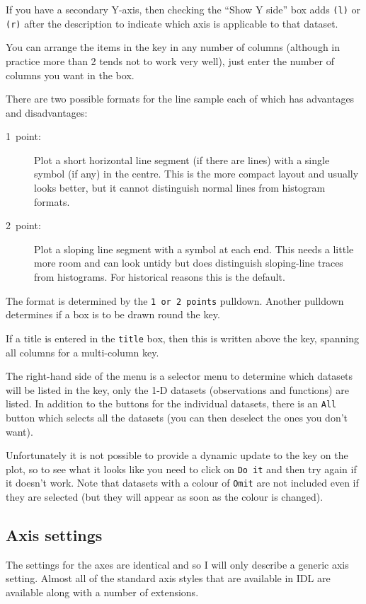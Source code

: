 \documentclass[11pt,twoside,english]{article}
\begin{document}
If you have a secondary Y-axis, then checking the ``Show Y side'' box
adds \texttt{(l)} or \texttt{(r)} after the description to indicate
which axis is applicable to that dataset.

You can arrange the items in the key in any number of columns (although
in practice more than 2 tends not to work very well), just enter the
number of columns you want in the box.

There are two possible formats for the line sample each of which has
advantages and disadvantages:

\begin{description}
\item [1~point:]Plot a short horizontal line segment (if there are
  lines) with a single symbol (if any) in the centre. This is the more
  compact layout and usually looks better, but it cannot distinguish
  normal lines from histogram formats.
\item [2~point:]Plot a sloping line segment with a symbol at each end.
  This needs a little more room and can look untidy but does
  distinguish sloping-line traces from histograms. For historical
  reasons this is the default.
\end{description}
The format is determined by the \texttt{1 or 2 points}
pulldown. Another pulldown determines if a box is to be drawn round the
key.

If a title is entered in the \texttt{title} box, then this is written
above the key, spanning all columns for a multi-column key.

The right-hand side of the menu is a selector menu to determine which
datasets will be listed in the key, only the 1-D datasets (observations
and functions) are listed. In addition to the buttons for the
individual datasets, there is an \texttt{All} button which selects all
the datasets (you can then deselect the ones you don't want).

Unfortunately it is not possible to provide a dynamic update to the key
on the plot, so to see what it looks like you need to click on
\texttt{Do it} and then try again if it doesn't work. Note that
datasets with a colour of \texttt{Omit} are not included even if they
are selected (but they will appear as soon as the colour is changed).


\subsection{Axis settings}

The settings for the axes are identical and so I will only describe a
generic axis setting. Almost all of the standard axis styles that are
available in IDL are available along with a number of extensions.
\end{document}

